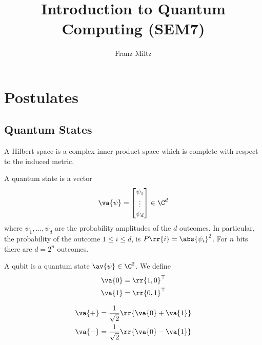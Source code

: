 \documentclass{article}
\title{Introduction to Quantum Computing (SEM7)}
\author{Franz Miltz}
\begin{document}
\maketitle
\tableofcontents
\pagebreak


\section{Postulates}
\label{sec:postulates}

\subsection{Quantum States}
\label{sec:quantum-states}

\begin{definition}
  \label{def:hilbert-space}
  A Hilbert space is a complex inner product space which is complete with respect to the induced metric.
\end{definition}

\begin{definition}
  \label{def:quantum-state}
  A quantum state is a vector
  \begin{align*}
    \va{ \psi } = \begin{bmatrix}
      \psi_1 \\
      \vdots \\
      \psi_d
    \end{bmatrix} \in \C^d
  \end{align*}
  where $\psi_1,...,\psi_d$ are the probability amplitudes of the $d$ outcomes.
  In particular, the probability of the outcome $1\leq i\leq d$, is $P \rr{ i } = \abs{ \psi_i }^2$.
  For $n$ bits there are $d=2^n$ outcomes.
\end{definition}

\begin{definition}
  \label{def:qubit}
  A qubit is a quantum state $ \av{ \psi } \in \C^2$. We define
  \begin{align*}
    \va{ 0 } = \rr{ 1, 0 }^\top\\
    \va{ 1 } = \rr{ 0, 1 }^\top
  \end{align*}
\end{definition}

\begin{definition}
  \label{def:superposition}
  \begin{align*}
    \va{ + } = \frac{1}{\sqrt{2}} \rr{ \va{ 0 } + \va{ 1 } } \\
    \va{ - } = \frac{1}{\sqrt{2}} \rr{ \va{ 0 } - \va{ 1 } }
  \end{align*}
\end{definition}
\end{document}
